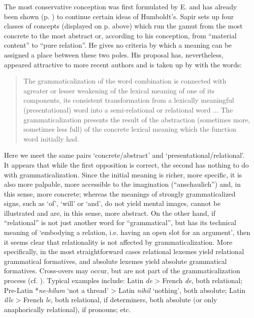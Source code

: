 The most conservative conception was first formulated by E. \citet[Ch.~V]{Sapir1921} and has already been shown (p. \pageref{SapirHumCh4}) to continue certain ideas of Humboldt's. Sapir sets up four classes of concepts (displayed on p. \pageref{SapirHumCh4} above) which run the gamut from the most concrete to the most abstract or, according to his conception, from “material content” to “pure relation”. He gives no criteria by which a meaning can be assigned a place between these two poles. His proposal has, nevertheless, appeared attractive to more recent authors and is taken up by \citet[83]{Žirmunskij1966} with the words:

\begin{quotation}
The grammaticalization of the word combination is connected with a\linebreak greater or lesser weakening of the lexical meaning of one of its components, its consistent transformation from a lexically meaningful (presentational) word into a semi-relational or relational word ... The grammaticalization presents the result of the abstraction (sometimes more, sometimes less full) of the concrete lexical meaning which the function word initially had.
\end{quotation}

\noindent Here we meet the same pairs ‘concrete/abstract’ and ‘presentational/relational’. It appears that while the first opposition is correct, the second has nothing to do with grammaticalization. Since the initial meaning is richer, more specific, it is also more palpable, more accessible to the imagination (“anschaulich”) and, in this sense, more concrete; whereas the meanings of strongly grammaticalized signs, such as ‘of’, ‘will’ or ‘and’, do not yield mental images, cannot be illustrated and are, in this sense, more abstract. On the other hand, if ``relational'' is not just another word for ``grammatical'', but has its technical meaning of ‘embodying a relation, i.e. having an open slot for an argument’, then it seems clear that relationality is not affected by grammaticalization. More specifically, in the most straightforward cases relational lexemes yield relational grammatical formatives, and absolute lexemes yield absolute grammatical formatives. Cross-overs may occur, but are not part of the grammaticalization process (cf. \pageref{page73}\chk%
). Typical examples include: Latin \textit{de} {\textgreater} French \textit{de}, both relational; Pre-Latin *\textit{ne-hilum} ‘not a thread’ {\textgreater} Latin \textit{nihil} ‘nothing’, both absolute; Latin \textit{ille} {\textgreater} French \textit{le}, both relational, if determiners, both absolute (or only anaphorically relational), if pronouns; etc.

